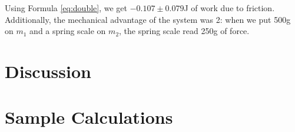 \documentclass[12pt]{article}
\begin{document}
Using Formula \ref{eq:double}, we get \(-0.107 \pm 0.079\)J of work due to friction. Additionally, the mechanical advantage of the system was 2: when we put 500g on \(m_1\) and a spring scale on \(m_2\), the spring scale read 250g of force.
\section{Discussion}
\label{sec:org5170d12}

\section{Sample Calculations}
\label{sec:org54964d1}
\end{document}
